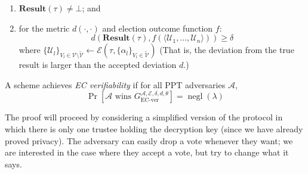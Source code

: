 \documentclass[12pt,a4paper]{article}
\DeclareMathOperator{\negl}{\text{negl}}
\theoremstyle{definition}
\begin{document}
\begin{definition}[EC Verifiability]
\begin{enumerate}
        \item $\mathbf{Result}(\tau) \neq \bot$; and
        \item for the metric $d(\cdot, \cdot)$ and election outcome function $f$:
                    $$d(\mathbf{Result}(\tau), f(\langle\mathcal{U}_1,\ldots,\mathcal{U}_n\rangle)) \geq \delta$$
            where $\{\mathcal{U}_l\}_{V_l \in \mathcal{V} \setminus \tilde{\mathcal{V}}} \leftarrow \mathcal{E}(\tau, \{\alpha_l \}_{V_l \in \tilde{\mathcal{V}}})$
            (That is, the deviation from the true result is larger than the accepted deviation $d$.)
    \end{enumerate}
    A scheme achieves \textit{EC verifiability} if for all PPT adversaries $\mathcal{A}$, $$\Pr\left[\mathcal{A}\text{ wins }G_\text{EC-ver}^{\mathcal{A},\mathcal{E},\delta,d,\theta}\right]=\negl(\lambda)$$
\end{definition}
The proof will proceed by considering a simplified version of the protocol in which there is only one trustee holding the decryption key (since we have already proved privacy). The adversary can easily drop a vote whenever they want; we are interested in the case where they accept a vote, but try to change what it says.
\end{document}
